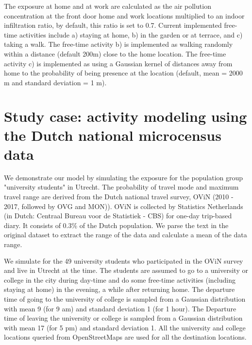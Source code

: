 \documentclass[]{article}
\begin{document}
The exposure at home and at work are calculated as the air pollution concentration at the front door home and work locations multiplied to an indoor infiltration ratio, by default, this ratio is set to 0.7. Current implemented free-time activities include a) staying at home, b) in the garden or at terrace,  and c) taking a walk. The free-time activity b) is implemented as walking randomly within a distance (default 200m) close to the home location. The free-time activity c) is implemented as using a Gaussian kernel of distances away from home to the probability of being presence at the location (default, mean = 2000 m and standard deviation = 1 m).   

\section{Study case: activity modeling using the Dutch national microcensus data}

We demonstrate our model by simulating the exposure for the population group "university students" in Utrecht. The probability of travel mode and maximum travel range are derived from the Dutch national travel survey, OViN (2010 - 2017, followed by OVG and MON)). OViN is collected by Statistics Netherlands (in Dutch: Centraal Bureau voor de Statistiek - CBS) for one-day trip-based diary. It consists of 0.3\% of the Dutch population. We parse the text in the original dataset to extract the range of the data and calculate a mean of the data range. 

We simulate for the 49 university students who participated in the OViN survey and live in Utrecht at the time. The students are assumed to go to a university or college in the city during day-time and do some free-time activities (including staying at home) in the evening, a while after returning home. The departure time of going to the university of college is sampled from a Gaussian distribution with mean 9 (for 9 am) and standard deviation 1 (for 1 hour). The Departure time of leaving the university or college is sampled from a Gaussian distribution with mean 17 (for 5 pm) and standard deviation 1. All the university and college locations queried from OpenStreetMaps are used for all the destination locations. 
 
 
 
 
\end{document}
